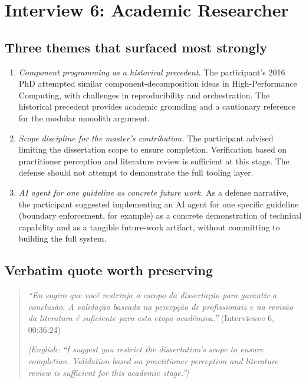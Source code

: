 
\section{Interview 6: Academic Researcher}
\label{sec:interview06}

\subsection*{Three themes that surfaced most strongly}

\begin{enumerate}[itemsep=3pt,topsep=2pt]
  \item \emph{Component programming as a historical precedent.} The participant's 2016 PhD attempted similar component-decomposition ideas in High-Performance Computing, with challenges in reproducibility and orchestration. The historical precedent provides academic grounding and a cautionary reference for the modular monolith argument.
  \item \emph{Scope discipline for the master's contribution.} The participant advised limiting the dissertation scope to ensure completion. Verification based on practitioner perception and literature review is sufficient at this stage. The defense should not attempt to demonstrate the full tooling layer.
  \item \emph{AI agent for one guideline as concrete future work.} As a defense narrative, the participant suggested implementing an AI agent for one specific guideline (boundary enforcement, for example) as a concrete demonstration of technical capability and as a tangible future-work artifact, without committing to building the full system.
\end{enumerate}

\subsection*{Verbatim quote worth preserving}

\begin{quote}
\emph{``Eu sugiro que você restrinja o escopo da dissertação para garantir a conclusão. A validação baseada na percepção de profissionais e na revisão da literatura é suficiente para esta etapa acadêmica.''} (Interviewee 6, 00:36:24)

\medskip

\emph{[English: ``I suggest you restrict the dissertation's scope to ensure completion. Validation based on practitioner perception and literature review is sufficient for this academic stage.'']}
\end{quote}

